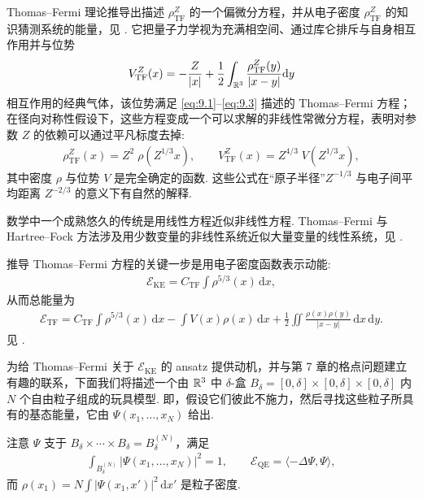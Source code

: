 Thomas--Fermi 理论推导出描述 $\rho_{\mathrm{TF}}^{Z}$ 的一个偏微分方程，并从电子密度 $\rho_{\mathrm{TF}}^{Z}$ 的知识猜测系统的能量，见 \cite{b221}. 它把量子力学视为充满相空间、通过库仑排斥与自身相互作用并与位势
\begin{align*}
  V_{\mathrm{TF}}^{Z}(x)=-\frac{Z}{\left|x\right|}+\frac{1}{2}\int_{\mathbb{R}^{3}}\frac{\rho_{\mathrm{TF}}^{Z}(y)}{\left|x-y\right|}\mathrm{d}y
\end{align*}
相互作用的经典气体，该位势满足 \eqref{eq:9.1}--\eqref{eq:9.3} 描述的 Thomas--Fermi 方程；在径向对称性假设下，这些方程变成一个可以求解的非线性常微分方程，表明对参数 $Z$ 的依赖可以通过平凡标度去掉:
\begin{align*}
  \rho_{\mathrm{TF}}^{Z}(x)=Z^{2}\;\rho(Z^{1/3}x),\qquad
  V_{\mathrm{TF}}^{Z}(x)=Z^{4/3}\;V(Z^{1/3}x),
\end{align*}
其中密度 $\rho$ 与位势 $V$ 是完全确定的函数. 这些公式在``原子半径''$Z^{-1/3}$ 与电子间平均距离 $Z^{-2/3}$ 的意义下有自然的解释.

数学中一个成熟悠久的传统是用线性方程近似非线性方程. Thomas--Fermi 与 Hartree--Fock 方法涉及用少数变量的非线性系统近似大量变量的线性系统，见 \cite{b221}.

\begin{remark*}
推导 Thomas--Fermi 方程的关键一步是用电子密度函数表示动能:
\begin{align*}
  \mathcal{E}_{\mathrm{KE}}=C_{\mathrm{TF}}\int\rho^{5/3}(x)\,\mathrm{d}x,
\end{align*}
从而总能量为
\begin{align*}
  \mathcal{E}_{\mathrm{TF}}=C_{\mathrm{TF}}\int\rho^{5/3}(x)\,\mathrm{d}x
  -\int V(x)\rho(x)\,\mathrm{d}x
  +\frac{1}{2}\iint\frac{\rho(x)\rho(y)}{|x-y|}\,\mathrm{d}x\,\mathrm{d}y.
\end{align*}
见 \cite{b221}.
\end{remark*}

为给 Thomas--Fermi 关于 $\mathcal{E}_{\mathrm{KE}}$ 的 ansatz 提供动机，并与第 7 章的格点问题建立有趣的联系，下面我们将描述一个由 $\mathbb{R}^3$ 中 $\delta$-盒 $B_{\delta} = [0, \delta] \times [0, \delta] \times [0, \delta]$ 内 $N$ 个自由粒子组成的玩具模型. 即，假设它们彼此不施力，然后寻找这些粒子所具有的基态能量，它由 $\Psi(x_1, \ldots, x_N)$ 给出.

注意 $\Psi$ 支于 $B_{\delta} \times \cdots \times B_{\delta} = B_{\delta}^{(N)}$，满足
\begin{align*}
  \int_{B_{\delta}^{(N)}}|\Psi(x_{1},\ldots,x_{N})|^{2}=1,\qquad
  \mathcal{E}_{\mathrm{QE}}=\langle-\Delta\Psi,\Psi\rangle,
\end{align*}
而 $\rho(x_1) = N\int |\Psi(x_1, x')|^2\,\mathrm{d}x'$ 是粒子密度.

